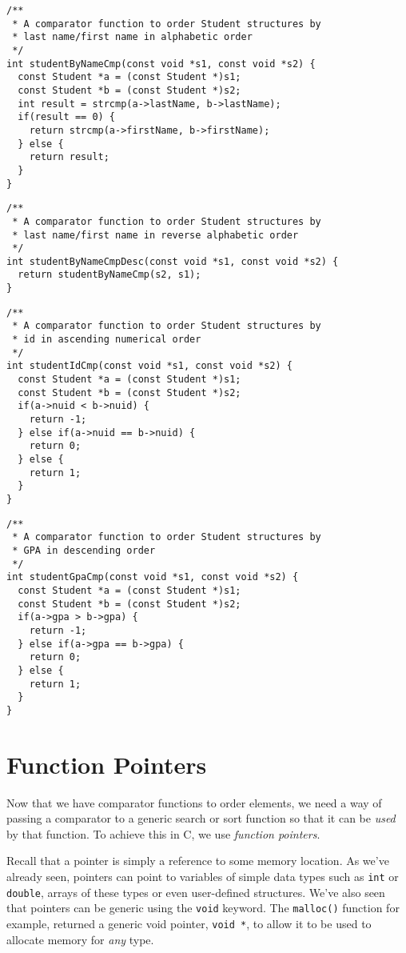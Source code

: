 \begin{verbatim}
/**
 * A comparator function to order Student structures by 
 * last name/first name in alphabetic order
 */
int studentByNameCmp(const void *s1, const void *s2) {
  const Student *a = (const Student *)s1;
  const Student *b = (const Student *)s2;
  int result = strcmp(a->lastName, b->lastName);
  if(result == 0) {
    return strcmp(a->firstName, b->firstName);
  } else {
    return result;
  }
}
\end{verbatim}

\begin{verbatim}
/**
 * A comparator function to order Student structures by 
 * last name/first name in reverse alphabetic order
 */
int studentByNameCmpDesc(const void *s1, const void *s2) {
  return studentByNameCmp(s2, s1);
}
\end{verbatim}

\begin{verbatim}
/**
 * A comparator function to order Student structures by 
 * id in ascending numerical order
 */
int studentIdCmp(const void *s1, const void *s2) {
  const Student *a = (const Student *)s1;
  const Student *b = (const Student *)s2;
  if(a->nuid < b->nuid) {
    return -1;
  } else if(a->nuid == b->nuid) {
    return 0;
  } else {
    return 1;
  }
}
\end{verbatim}

\begin{verbatim}
/**
 * A comparator function to order Student structures by 
 * GPA in descending order
 */
int studentGpaCmp(const void *s1, const void *s2) {
  const Student *a = (const Student *)s1;
  const Student *b = (const Student *)s2;
  if(a->gpa > b->gpa) {
    return -1;
  } else if(a->gpa == b->gpa) {
    return 0;
  } else {
    return 1;
  }
}
\end{verbatim}

\section{Function Pointers}

Now that we have comparator functions to order elements, we need a way
of passing a comparator to a generic search or sort function so that it
can be \emph{used} by that function.  To achieve this in C, we use
\emph{function pointers}.  

Recall that a pointer is simply a reference to some memory location.
As we've already seen, pointers can point to variables of simple
data types such as \texttt{int} or \texttt{double}, 
arrays of these types or even user-defined structures.  We've also
seen that pointers can be generic using the \texttt{void} keyword.
The \texttt{malloc()} function for example, returned a generic
void pointer, \texttt{void *}, to allow it to be used to allocate
memory for \emph{any} type.

